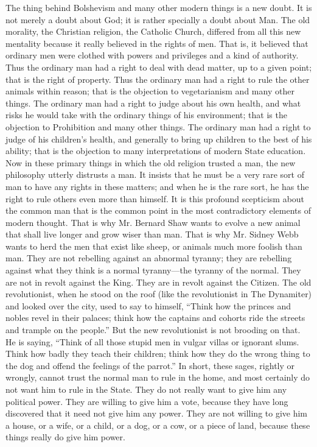 \documentclass{book}
\begin{document}
The thing behind Bolshevism and many other modern things is a new doubt. It is not merely a doubt about God; it is rather specially a doubt about Man. The old morality, the Christian religion, the Catholic Church, differed from all this new mentality because it really believed in the rights of men. That is, it believed that ordinary men were clothed with powers and privileges and a kind of authority. Thus the ordinary man had a right to deal with dead matter, up to a given point; that is the right of property. Thus the ordinary man had a right to rule the other animals within reason; that is the objection to vegetarianism and many other things. The ordinary man had a right to judge about his own health, and what risks he would take with the ordinary things of his environment; that is the objection to Prohibition and many other things. The ordinary man had a right to judge of his children’s health, and generally to bring up children to the best of his ability; that is the objection to many interpretations of modern State education. Now in these primary things in which the old religion trusted a man, the new philosophy utterly distrusts a man. It insists that he must be a very rare sort of man to have any rights in these matters; and when he is the rare sort, he has the right to rule others even more than himself. It is this profound scepticism about the common man that is the common point in the most contradictory elements of modern thought. That is why Mr. Bernard Shaw wants to evolve a new animal that shall live longer and grow wiser than man. That is why Mr. Sidney Webb wants to herd the men that exist like sheep, or animals much more foolish than man. They are not rebelling against an abnormal tyranny; they are rebelling against what they think is a normal tyranny—the tyranny of the normal. They are not in revolt against the King. They are in revolt against the Citizen. The old revolutionist, when he stood on the roof (like the revolutionist in The Dynamiter) and looked over the city, used to say to himself, “Think how the princes and nobles revel in their palaces; think how the captains and cohorts ride the streets and trample on the people.” But the new revolutionist is not brooding on that. He is saying, “Think of all those stupid men in vulgar villas or ignorant slums. Think how badly they teach their children; think how they do the wrong thing to the dog and offend the feelings of the parrot.” In short, these sages, rightly or wrongly, cannot trust the normal man to rule in the home, and most certainly do not want him to rule in the State. They do not really want to give him any political power. They are willing to give him a vote, because they have long discovered that it need not give him any power. They are not willing to give him a house, or a wife, or a child, or a dog, or a cow, or a piece of land, because these things really do give him power.
\end{document}
